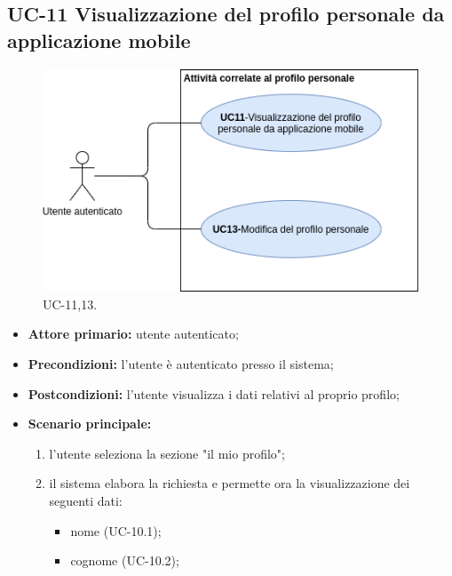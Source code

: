 \subsection{UC-11 Visualizzazione del profilo personale da applicazione mobile}

\begin{figure}[H]
	\centering
	\includegraphics[width=\textwidth]{src/CasiDUso/immagini/ProfiloPersonale.png}
	\caption{UC-11,13.}
\end{figure}

\begin{itemize}
	\item \textbf{Attore primario:} utente autenticato;

	\item \textbf{Precondizioni:} l'utente è autenticato presso il sistema;

	\item \textbf{Postcondizioni:} l'utente visualizza i dati relativi al proprio profilo;

	\item \textbf{Scenario principale:}
		\begin{enumerate}
   			 \item  l'utente seleziona la sezione "il mio profilo";
    		 \item  il sistema elabora la richiesta e permette ora la visualizzazione dei seguenti dati:
   			\begin{itemize}
     			\item nome (UC-10.1);
         	    \item cognome (UC-10.2);
   			\end{itemize}
	   	\end{enumerate}
\end{itemize}


